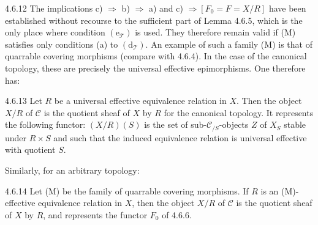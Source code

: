\begin{remark}{4.6.12}\label{IV.4.6.12}
The implications c) \(\Rightarrow\) b) \(\Rightarrow\) a)
and c) \(\Rightarrow[F_0=F=X/R]\) have been established
without recourse to the \og sufficient\fg{} part of Lemma 4.6.5,
which is the only place where condition \((\mathrm e_{\mathcal T})\)
is used. They therefore remain valid if (M) satisfies only
conditions (a) to \((\mathrm d_{\mathcal T})\).
An example of such a family (M) is that of quarrable
covering morphisms (compare with 4.6.4).
In the case of the canonical topology, these are precisely
the universal effective epimorphisms. One therefore has:
\end{remark}

\begin{corollary}{4.6.13}\label{IV.4.6.13}
Let \(R\) be a universal effective equivalence relation in \(X\).
Then the object \(X/R\) of \(\mathcal C\) is the quotient sheaf
of \(X\) by \(R\) for the canonical topology.
It represents the following functor:
\((X/R)(S)\) is the set of sub-\(\mathcal C_{/S}\)-objects
\(Z\) of \(X_S\) stable under \(R\times S\) and such that
the induced equivalence relation is universal effective
with quotient \(S\).
\end{corollary}
Similarly, for an arbitrary topology:
\begin{corollary}{4.6.14}\label{IV.4.6.14}
Let (M) be the family of quarrable covering morphisms.
If \(R\) is an (M)-effective equivalence relation in \(X\),
then the object \(X/R\) of \(\mathcal C\) is the quotient
sheaf of \(X\) by \(R\), and represents the functor \(F_0\)
of 4.6.6.
\end{corollary}

